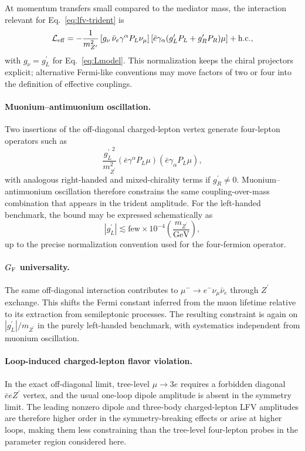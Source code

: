\documentclass[
  aps,
  prl,
  twocolumn,
  superscriptaddress,
  amsmath, amssymb,
  floatfix, nofootinbib,
  longbibliography,
]{revtex4-2}
\newcommand{\Zp}{Z^{\prime}}
\newcommand{\GF}{G_{\rm F}}
\newcommand{\mZp}{m_{\Zp}}
\newcommand{\gL}{{g^{\prime}_L}}
\newcommand{\gR}{{g^{\prime}_R}}
\newcommand{\gnu}{{g_\nu}}
\newcommand{\PL}{P_L}
\newcommand{\PR}{P_R}
\begin{document}
At momentum transfers small compared to the mediator mass, the
interaction relevant for Eq.~\eqref{eq:lfv-trident} is
\begin{equation}
  \mathcal{L}_{\rm eff}
  =
  -\frac{1}{\mZp^2}
  \left[\gnu\,\bar\nu_e\gamma^\alpha \PL\nu_\mu\right]
  \left[\bar e\gamma_\alpha(\gL\PL+\gR\PR)\mu\right]
  +\mathrm{h.c.},
\label{eq:Leff}
\end{equation}
with $\gnu=\gL$ for Eq.~\eqref{eq:Lmodel}.  This normalization keeps
the chiral projectors explicit; alternative Fermi-like conventions may
move factors of two or four into the definition of effective couplings.

\paragraph{Muonium--antimuonium oscillation.}
Two insertions of the off-diagonal charged-lepton vertex generate
four-lepton operators such as
\begin{equation}
  \frac{\gL^2}{\mZp^2}
  (\bar e\gamma^\alpha\PL\mu)
  (\bar e\gamma_\alpha\PL\mu),
\end{equation}
with analogous right-handed and mixed-chirality terms if $\gR\neq0$.
Muonium--antimuonium oscillation therefore constrains the same
coupling-over-mass combination that appears in the trident amplitude.
For the left-handed benchmark, the bound may be expressed
schematically as
\begin{equation}
  |\gL|\lesssim \text{few}\times10^{-4}
  \left(\frac{\mZp}{\mathrm{GeV}}\right),
\label{eq:bound-MM}
\end{equation}
up to the precise normalization convention used for the four-fermion
operator.

\paragraph{$\GF$ universality.}
The same off-diagonal interaction contributes to
$\mu^-\to e^-\nu_\mu\bar\nu_e$ through $\Zp$ exchange.  This shifts the
Fermi constant inferred from the muon lifetime relative to its
extraction from semileptonic processes.  The resulting constraint is
again on $|\gL|/\mZp$ in the purely left-handed benchmark, with
systematics independent from muonium oscillation.

\paragraph{Loop-induced charged-lepton flavor violation.}
In the exact off-diagonal limit, tree-level $\mu\to 3e$ requires a
forbidden diagonal $\bar e e\Zp$ vertex, and the usual one-loop dipole
amplitude is absent in the symmetry limit.  The leading nonzero
dipole and three-body charged-lepton LFV amplitudes are therefore
higher order in the symmetry-breaking effects or arise at higher loops,
making them less constraining than the tree-level four-lepton probes
in the parameter region considered here.
\end{document}

